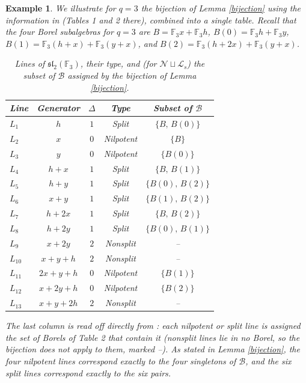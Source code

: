 \documentclass[11pt]{amsart}
\theoremstyle{plain}
\newtheorem{example}[theorem]{Example}
\def\F{\mathbb{F}}
\begin{document}
\begin{example}
We illustrate for $q=3$ the bijection of Lemma \ref{bijection} using the information in \cite[Example 4.13]{TZG} (Tables 1 and 2 there), combined into
a single table.  Recall that the four Borel subalgebras for $q=3$ are $B=\F_3 x + \F_3 h$, $B(0)=\F_3 h+\F_3 y$, $B(1)=\F_3(h+x)+\F_3(y+x)$, and $B(2) =\F_3(h+2x) +\F_3(y+x)$.
\smallskip

\begin{table}[H]
\centering
\caption{Lines of $\mathfrak{sl}_2(\F_3)$, their type, and (for $\mathcal{N}\sqcup \mathcal{L}_s$) the subset of $\mathcal{B}$ assigned by the bijection of Lemma \ref{bijection}.}
\smallskip
\begin{tabular}{l|c|c|c|c}
\hline
Line & Generator & $\Delta$ & Type & Subset of $\mathcal{B}$ \\
\hline
$L_1$    & $h$        & $1$ & Split     & $\{B,\,B(0)\}$ \\
$L_2$    & $x$        & $0$ & Nilpotent & $\{B\}$ \\
$L_3$    & $y$        & $0$ & Nilpotent & $\{B(0)\}$ \\
$L_4$    & $h+x$      & $1$ & Split     & $\{B,\,B(1)\}$ \\
$L_5$    & $h+y$      & $1$ & Split     & $\{B(0),\,B(2)\}$ \\
$L_6$    & $x+y$      & $1$ & Split     & $\{B(1),\,B(2)\}$ \\
$L_7$    & $h+2x$     & $1$ & Split     & $\{B,\,B(2)\}$ \\
$L_8$    & $h+2y$     & $1$ & Split     & $\{B(0),\,B(1)\}$ \\
$L_9$    & $x+2y$     & $2$ & Nonsplit  & -- \\
$L_{10}$ & $x+y+h$    & $2$ & Nonsplit  & -- \\
$L_{11}$ & $2x+y+h$   & $0$ & Nilpotent & $\{B(1)\}$ \\
$L_{12}$ & $x+2y+h$   & $0$ & Nilpotent & $\{B(2)\}$ \\
$L_{13}$ & $x+y+2h$   & $2$ & Nonsplit  & -- \\
\hline
\end{tabular}
\end{table}

The last column is read off directly from \cite[Tables 1 and 2]{TZG}: each nilpotent or split line is assigned the set of Borels of Table 2 that contain it (nonsplit lines lie in no Borel, so the bijection does not apply to them, marked --).  As stated in Lemma \ref{bijection}, the four nilpotent lines correspond exactly to the four singletons of $\mathcal{B}$, and the six split lines correspond exactly to the six pairs.
\end{example}
\end{document}
